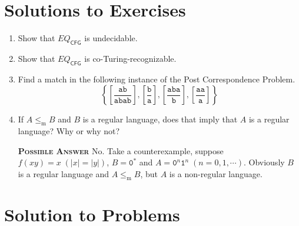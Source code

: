 \section*{Solutions to Exercises}

\begin{enumerate}[font=\bfseries,label=5.\arabic*]

    \item Show that $\textit{EQ}_\textsf{CFG}$ is undecidable.
    
    \item Show that $\textit{EQ}_\textsf{CFG}$ is co-Turing-recognizable.
    
    \item Find a match in the following instance of the Post Correspondence Problem.
    \[ \left\{
        \left[ \frac{\texttt{ab}}{\texttt{abab}} \right],
        \left[ \frac{\texttt{b}}{\texttt{a}} \right],
        \left[ \frac{\texttt{aba}}{\texttt{b}} \right],
        \left[ \frac{\texttt{aa}}{\texttt{a}} \right]
    \right\} \]
    
    \item If $A \le_\mathrm m B$ and $B$ is a regular language, does that imply that $A$ is a regular language? Why or why not?
    
    \textsc{\textbf{Possible Answer}} No. Take a counterexample, suppose $f(xy)=x \; (|x|=|y|)$, $B=\texttt{0}^\ast$ and $A=\texttt{0}^n\texttt{1}^n \; (n=0,1,\cdots)$. Obviously $B$ is a regular language and $A \le_\mathrm m B$, but $A$ is a non-regular language.

\end{enumerate}

\section*{Solution to Problems}

